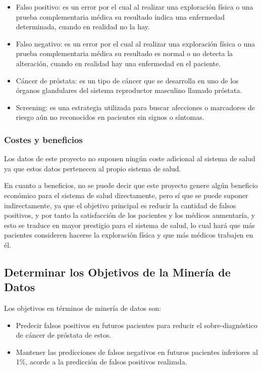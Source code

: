 \documentclass{article}
\begin{document}
\begin{itemize}
	\item Falso positivo: es un error por el cual al realizar una exploración física o una prueba complementaria médica su resultado indica una enfermedad determinada, cuando en realidad no la hay.
	\item Falso negativo: es un error por el cual al realizar una exploración física o una prueba complementaria médica su resultado es normal o no detecta la alteración, cuando en realidad hay una enfermedad en el paciente.
	\item Cáncer de próstata: es un tipo de cáncer que se desarrolla en uno de los órganos glandulares del sistema reproductor masculino llamado próstata.
	\item Screening: es una estrategia utilizada para buscar afecciones o marcadores de riesgo aún no reconocidos en pacientes sin signos o síntomas.
\end{itemize}

\subsubsection{Costes y beneficios}
Los datos de este proyecto no suponen ningún coste adicional al sistema de salud ya que estos datos pertenecen al propio sistema de salud.

En cuanto a beneficios, no se puede decir que este proyecto genere algún beneficio económico para el sistema de salud directamente, pero sí que se puede suponer indirectamente, ya que el objetivo principal es reducir la cantidad de falsos positivos, y por tanto la satisfacción de los pacientes y los médicos aumentaría, y esto se traduce en mayor prestigio para el sistema de salud, lo cual hará que más pacientes consideren hacerse la exploración física y que más médicos trabajen en él.

\subsection{Determinar los Objetivos de la Minería de Datos}
Los objetivos en términos de minería de datos son:

\begin{itemize}
	\item Predecir falsos positivos en futuros pacientes para reducir el sobre-diagnóstico de cáncer de próstata de estos.
	\item Mantener las predicciones de falsos negativos en futuros pacientes inferiores al 1\%, acorde a la predicción de falsos positivos realizada.
\end{itemize}
\end{document}
